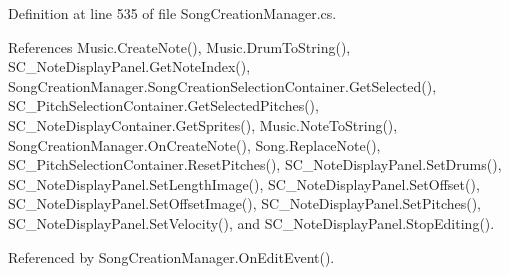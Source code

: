 Definition at line 535 of file Song\+Creation\+Manager.\+cs.



References Music.\+Create\+Note(), Music.\+Drum\+To\+String(), S\+C\+\_\+\+Note\+Display\+Panel.\+Get\+Note\+Index(), Song\+Creation\+Manager.\+Song\+Creation\+Selection\+Container.\+Get\+Selected(), S\+C\+\_\+\+Pitch\+Selection\+Container.\+Get\+Selected\+Pitches(), S\+C\+\_\+\+Note\+Display\+Container.\+Get\+Sprites(), Music.\+Note\+To\+String(), Song\+Creation\+Manager.\+On\+Create\+Note(), Song.\+Replace\+Note(), S\+C\+\_\+\+Pitch\+Selection\+Container.\+Reset\+Pitches(), S\+C\+\_\+\+Note\+Display\+Panel.\+Set\+Drums(), S\+C\+\_\+\+Note\+Display\+Panel.\+Set\+Length\+Image(), S\+C\+\_\+\+Note\+Display\+Panel.\+Set\+Offset(), S\+C\+\_\+\+Note\+Display\+Panel.\+Set\+Offset\+Image(), S\+C\+\_\+\+Note\+Display\+Panel.\+Set\+Pitches(), S\+C\+\_\+\+Note\+Display\+Panel.\+Set\+Velocity(), and S\+C\+\_\+\+Note\+Display\+Panel.\+Stop\+Editing().



Referenced by Song\+Creation\+Manager.\+On\+Edit\+Event().


